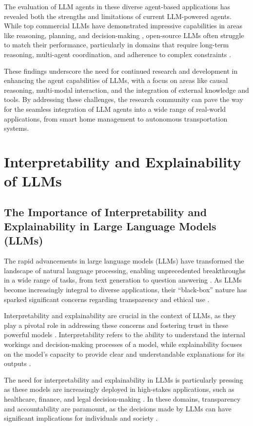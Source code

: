\documentclass[11pt]{article}
\begin{document}
The evaluation of LLM agents in these diverse agent-based applications has revealed both the strengths and limitations of current LLM-powered agents. While top commercial LLMs have demonstrated impressive capabilities in areas like reasoning, planning, and decision-making \cite{ref230,ref231}, open-source LLMs often struggle to match their performance, particularly in domains that require long-term reasoning, multi-agent coordination, and adherence to complex constraints \cite{ref233}.

These findings underscore the need for continued research and development in enhancing the agent capabilities of LLMs, with a focus on areas like causal reasoning, multi-modal interaction, and the integration of external knowledge and tools. By addressing these challenges, the research community can pave the way for the seamless integration of LLM agents into a wide range of real-world applications, from smart home management to autonomous transportation systems.

\section{Interpretability and Explainability of LLMs}

\subsection{The Importance of Interpretability and Explainability in Large Language Models (LLMs)}

The rapid advancements in large language models (LLMs) have transformed the landscape of natural language processing, enabling unprecedented breakthroughs in a wide range of tasks, from text generation to question answering \cite{ref236,ref237}. As LLMs become increasingly integral to diverse applications, their ``black-box'' nature has sparked significant concerns regarding transparency and ethical use \cite{ref238,ref55}.

Interpretability and explainability are crucial in the context of LLMs, as they play a pivotal role in addressing these concerns and fostering trust in these powerful models \cite{ref236,ref237}. Interpretability refers to the ability to understand the internal workings and decision-making processes of a model, while explainability focuses on the model's capacity to provide clear and understandable explanations for its outputs \cite{ref239}.

The need for interpretability and explainability in LLMs is particularly pressing as these models are increasingly deployed in high-stakes applications, such as healthcare, finance, and legal decision-making \cite{ref240,ref28}. In these domains, transparency and accountability are paramount, as the decisions made by LLMs can have significant implications for individuals and society \cite{ref35}.
\end{document}
